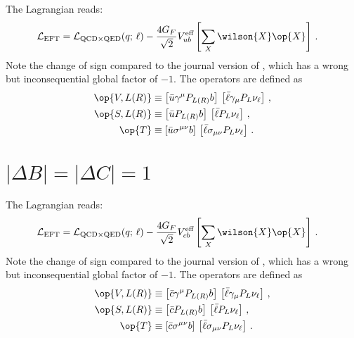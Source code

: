 The Lagrangian reads:
\begin{equation}
\begin{aligned}
  {\cal L}_\text{EFT} &
  = {\cal L}_{\text{QCD} \times \text{QED}} (q;\, \ell) - \frac{4 G_F}{\sqrt{2}} V_{ub}^\text{eff} \left[
      \sum_{X}  \wilson{X} \op{X}
    \right] \,.
\end{aligned}
\end{equation}
Note the change of sign compared to the journal version of \cite{Feldmann:2015xsa}, which has a
wrong but inconsequential global factor of $-1$. The operators are defined as
\begin{equation}
\begin{aligned}
    \op{V,L(R)}
        & \equiv \left[\bar{u} \gamma^\mu P_{L(R)} b\right]\,\left[\bar{\ell} \gamma_\mu P_L \nu_\ell\right]\,, \\
    \op{S,L(R)}
        & \equiv \left[\bar{u} P_{L(R)} b\right]\,\left[\bar{\ell} P_L \nu_\ell\right]\,, \\
    \op{T}
        & \equiv \left[\bar{u} \sigma^{\mu\nu} b\right]\,\left[\bar{\ell} \sigma_{\mu\nu} P_L \nu_\ell\right]\,.
\end{aligned}
\end{equation}


\section{$|\Delta B| = |\Delta C| = 1$}

The Lagrangian reads:
\begin{equation}
\begin{aligned}
  {\cal L}_\text{EFT} &
  = {\cal L}_{\text{QCD} \times \text{QED}} (q;\, \ell) - \frac{4 G_F}{\sqrt{2}} V_{cb}^\text{eff} \left[
      \sum_{X}  \wilson{X} \op{X}
    \right] \,.
\end{aligned}
\end{equation}
Note the change of sign compared to the journal version of \cite{Feldmann:2015xsa}, which has a
wrong but inconsequential global factor of $-1$. The operators are defined as
\begin{equation}
\begin{aligned}
    \op{V,L(R)}
        & \equiv \left[\bar{c} \gamma^\mu P_{L(R)} b\right]\,\left[\bar{\ell} \gamma_\mu P_L \nu_\ell\right]\,, \\
    \op{S,L(R)}
        & \equiv \left[\bar{c} P_{L(R)} b\right]\,\left[\bar{\ell} P_L \nu_\ell\right]\,, \\
    \op{T}
        & \equiv \left[\bar{c} \sigma^{\mu\nu} b\right]\,\left[\bar{\ell} \sigma_{\mu\nu} P_L \nu_\ell\right]\,.
\end{aligned}
\end{equation}

